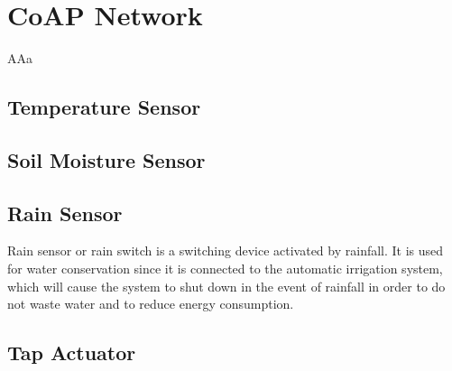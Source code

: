 \section{CoAP Network}
AAa

\subsection{Temperature Sensor}

\subsection{Soil Moisture Sensor}

\subsection{Rain Sensor}
Rain sensor or rain switch is a switching device activated by rainfall. It is used for water conservation since it is connected to the automatic irrigation system, which will cause the system to shut down in the event of rainfall in order to do not waste water and to reduce energy consumption.

\subsection{Tap Actuator}

